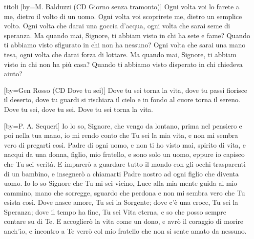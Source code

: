 \begin{songs}{titoli}
[by={M. Balduzzi (CD Giorno senza tramonto)}]
\beginchorus
Ogni volta voi lo farete a me, dietro il volto di un uomo.
Ogni volta voi scoprirete me, dietro un semplice volto.
\endchorus
\beginverse
Ogni volta che darai una goccia d'acqua,
ogni volta che sarai seme di speranza.
\endverse
\beginverse
Ma quando mai, Signore, ti abbiam visto in chi ha sete e fame?
Quando ti abbiamo visto sfigurato in chi non ha nessuno?
\endverse
\beginverse
Ogni volta che sarai una mano tesa,
ogni volta che darai forza di lottare.
\endverse
\beginverse
Ma quando mai, Signore, ti abbiam visto in chi non ha più casa?
Quando ti abbiamo visto disperato in chi chiedeva aiuto?
\endverse
\endsong

[by={Gen Rosso (CD Dove tu sei)}]
\beginverse*
Dove tu sei torna la vita,
dove tu passi fiorisce il deserto,
dove tu guardi si rischiara il cielo
e in fondo al cuore torna il sereno.
Dove tu sei,
dove tu sei. 
\endverse
\beginverse*
Dove tu sei
torna la vita.
\endverse
\endsong

[by={P. A. Sequeri}]
\beginverse
Io lo so, Signore, che vengo da lontano,
prima nel pensiero e poi nella tua mano,
io mi rendo conto che Tu sei la mia vita,
e non mi sembra vero di pregarti così.
\endverse
\beginverse
Padre di ogni uomo, e non ti ho visto mai,
spirito di vita, e nacqui da una donna,
figlio, mio fratello, e sono solo un uomo,
eppure io capisco che Tu sei verità.
\endverse
\beginchorus
E imparerò a guardare tutto il mondo
con gli occhi trasparenti di un bambino,
e insegnerò a chiamarti Padre nostro
ad ogni figlio che diventa uomo. 
\endchorus
\beginverse
Io lo so Signore che Tu mi sei vicino,
Luce alla mia mente guida al mio cammino,
mano che sorregge, sguardo che perdona
e non mi sembra vero che Tu esista così.
\endverse
\beginverse
Dove nasce amore, Tu sei la Sorgente;
dove c'è una croce, Tu sei la Speranza;
dove il tempo ha fine, Tu sei Vita eterna,
e so che posso sempre contare su di Te.
\endverse
\beginchorus
E accoglierò la vita come un dono,
e avrò il coraggio di morire anch'io,
e incontro a Te verrò col mio fratello
che non si sente amato da nessuno. 
\endchorus
\endsong


\end{songs}
